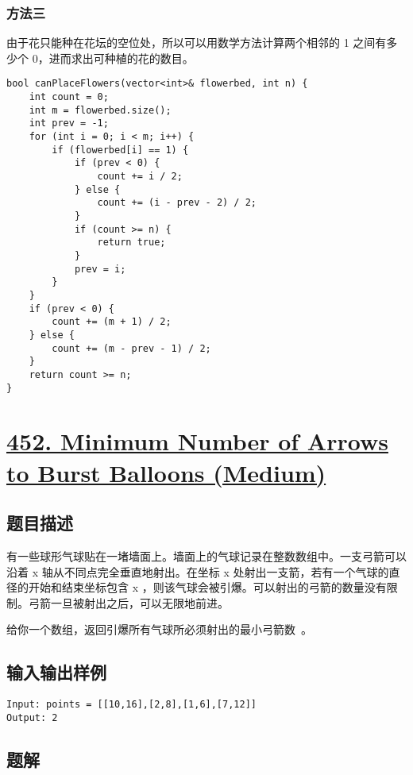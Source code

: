 \documentclass[lang=cn,10pt]{elegantbook}
\begin{document}
\subsubsection*{方法三}

由于花只能种在花坛的空位处，所以可以用数学方法计算两个相邻的 1 之间有多少个 0，进而求出可种植的花的数目。

\begin{lstlisting}
bool canPlaceFlowers(vector<int>& flowerbed, int n) {
	int count = 0;
	int m = flowerbed.size();
	int prev = -1;
	for (int i = 0; i < m; i++) {
		if (flowerbed[i] == 1) {
			if (prev < 0) {
				count += i / 2;
			} else {
				count += (i - prev - 2) / 2;
			}
			if (count >= n) {
				return true;
			}
			prev = i;
		}
	}
	if (prev < 0) {
		count += (m + 1) / 2;
	} else {
		count += (m - prev - 1) / 2;
	}
	return count >= n;
}
\end{lstlisting}

{\color{red}\section{\href{https://leetcode.cn/problems/minimum-number-of-arrows-to-burst-balloons/}{452. Minimum Number of Arrows to Burst Balloons (Medium)}}} \label{Ch2.452}

\subsection*{题目描述}

有一些球形气球贴在一堵墙面上。墙面上的气球记录在整数数组中。一支弓箭可以沿着 x 轴从不同点完全垂直地射出。在坐标 x 处射出一支箭，若有一个气球的直径的开始和结束坐标包含 x ，则该气球会被引爆。可以射出的弓箭的数量没有限制。弓箭一旦被射出之后，可以无限地前进。

给你一个数组，返回引爆所有气球所必须射出的最小弓箭数 。

\subsection*{输入输出样例}

\begin{lstlisting}
Input: points = [[10,16],[2,8],[1,6],[7,12]]
Output: 2
\end{lstlisting}

\subsection*{题解}
\end{document}
